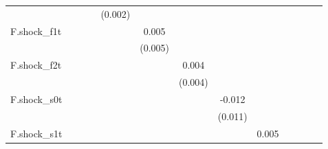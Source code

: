 {\begin{tabular}{l*{12}{c}}
            &                     &                     &                     &     (0.002)         &                     &                     &                     &                     &                     &                     &                     &                     \\
\addlinespace
F.shock\_f1t &                     &                     &                     &                     &       0.005         &                     &                     &                     &                     &                     &                     &                     \\
            &                     &                     &                     &                     &     (0.005)         &                     &                     &                     &                     &                     &                     &                     \\
\addlinespace
F.shock\_f2t &                     &                     &                     &                     &                     &       0.004         &                     &                     &                     &                     &                     &                     \\
            &                     &                     &                     &                     &                     &     (0.004)         &                     &                     &                     &                     &                     &                     \\
\addlinespace
F.shock\_s0t &                     &                     &                     &                     &                     &                     &      -0.012         &                     &                     &                     &                     &                     \\
            &                     &                     &                     &                     &                     &                     &     (0.011)         &                     &                     &                     &                     &                     \\
\addlinespace
F.shock\_s1t &                     &                     &                     &                     &                     &                     &                     &       0.005         &                     &                     &                     &                     \\

\end{tabular}}
